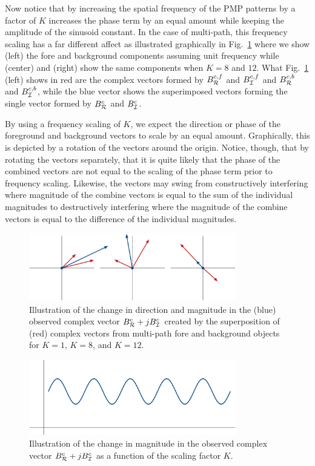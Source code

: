\documentclass[10pt]{article}
\begin{document}
Now notice that by increasing the spatial frequency of the PMP patterns by a factor of $K$ increases the phase term by an equal amount while keeping the amplitude of the sinusoid constant.  In the case of multi-path, this frequency scaling has a far different affect as illustrated graphically in Fig.~\ref{fig00} where we show (left) the fore and background components assuming unit frequency while (center) and (right) show the same components when $K=8$ and $12$.  What Fig.~\ref{fig00} (left) shows in red are the complex vectors formed by $B^{c,f}_{\cal R}$ and $B^{c,f}_{\cal I}$ and $B^{c,b}_{\cal R}$ and $B^{c,b}_{\cal I}$, while the blue vector shows the superimposed vectors forming the single vector formed by $B^c_{\cal R}$ and $B^c_{\cal I}$. 

By using a frequency scaling of $K$, we expect the direction or phase of the foreground and background vectors to scale by an equal amount.  
Graphically, this is depicted by a rotation of the vectors around the origin.  Notice, though, that by rotating the vectors separately, that it is quite likely that the phase of the combined vectors are not equal to the scaling of the phase term prior to frequency scaling.  Likewise, the vectors may swing from constructively interfering where magnitude of the combine vectors is equal to the sum of the individual magnitudes to destructively interfering where the magnitude of the combine vectors is equal to the difference of the individual magnitudes. 

\begin{figure}[!t]
\centering\includegraphics[width=3.55in]{Figures/figure00}
\caption{Illustration of the change in direction and magnitude in the (blue) observed complex vector ${B^c_{\cal R}}+j{B^c_{\cal I}}$ created by the superposition of (red) complex vectors from multi-path fore and background objects for $K=1$, $K=8$, and $K=12$.}
\label{fig00}
\end{figure}

\begin{figure}[!t]
\centering\includegraphics[width=3.55in]{Figures/figure01}
\caption{Illustration of the change in magnitude in the observed complex vector ${B^c_{\cal R}}+j{B^c_{\cal I}}$ as a function of the scaling factor $K$.}
\label{fig01}
\end{figure}
\end{document}
